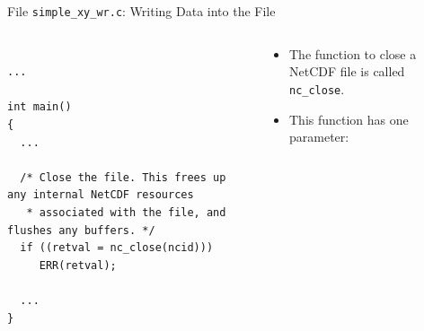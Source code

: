 \documentclass[compress,11pt,xcolor=svgnames,aspectratio=169]{beamer}
\begin{document}
\begin{frame}[fragile]{File \texttt{simple\_xy\_wr.c}: Writing Data into the File}

\begin{columns}

\begin{column}{0.5\textwidth}

{\tiny

\begin{verbatim}

...

int main()
{
  ...

  /* Close the file. This frees up any internal NetCDF resources
   * associated with the file, and flushes any buffers. */
  if ((retval = nc_close(ncid)))
     ERR(retval);

  ...
}

\end{verbatim}

}

\end{column}

\begin{column}{0.5\textwidth}

{\footnotesize

\begin{itemize}
\setlength\itemsep{0.5cm}

\item The function to close a NetCDF file is called \verb|nc_close|.

\item This function has one parameter:



\end{itemize}

}

\end{column}

\end{columns}

\end{frame}
\end{document}
